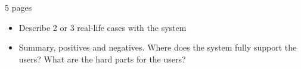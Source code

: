 5 pages

\begin{itemize}
	\item Describe 2 or 3 real-life cases with the system
	\item Summary, positives and negatives. Where does the system fully support the users? What are the hard parts for the users?
\end{itemize}